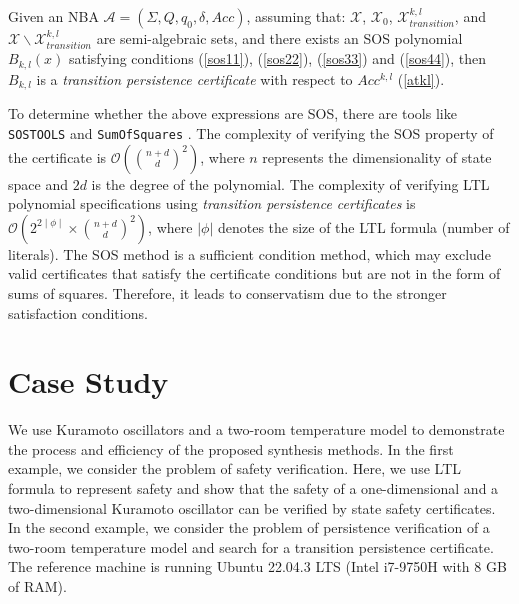 \documentclass[acmlarge]{acmart}
\begin{document}
\begin{lemma}
  Given an NBA $\mathcal{A} = (\Sigma, Q, q_0, \delta, Acc)$, assuming that: $ \mathcal{X}$, $ \mathcal{X}_{0}$, $\mathcal{X}_{transition}^{k,l}$, and $\mathcal{X} \backslash \mathcal{X}_{transition}^{k,l}$ are semi-algebraic sets, and there exists an SOS polynomial $B_{k, l}(x)$ satisfying conditions (\ref{sos11}), (\ref{sos22}), (\ref{sos33}) and (\ref{sos44}), then $B_{k, l}$ is a \textit{transition persistence certificate} with respect to $Acc^{k, l}$ (\ref{atkl}).
\end{lemma}

To determine whether the above expressions are SOS, there are tools like \texttt{SOSTOOLS} \cite{prajna2002introducing} and \texttt{SumOfSquares} \cite{Yuan_SumOfSquares_py}. The complexity of verifying the SOS property of the certificate is $\mathcal{O}\left( \binom{n+d}{d}^2 \right) $\cite{parrilo2003semidefinite}, where $ n $ represents the dimensionality of state space  and $ 2d $ is the degree of the polynomial. The complexity of verifying LTL polynomial specifications using \emph{transition persistence certificates} is $\mathcal{O}\left( 2^{2 \mid \phi \mid } \times \binom{n+d}{d}^2 \right)$, where $|\phi|$ denotes the size of the LTL formula (number of literals). The SOS method is a sufficient condition method, which may exclude valid certificates that satisfy the certificate conditions but are not in the form of sums of squares. Therefore, it leads to conservatism due to the stronger satisfaction conditions.


\section{Case Study}
We use Kuramoto oscillators \cite{guo2021overviews} and a two-room temperature model \cite{anand2024compositional} to demonstrate the process and efficiency of the proposed synthesis methods.
In the first example, we consider the problem of safety verification. Here, we use LTL formula to represent safety and show that the safety of a one-dimensional and a two-dimensional Kuramoto oscillator can be verified by state safety certificates. In the second example, we consider the problem of persistence verification of a two-room temperature model and search for a transition persistence certificate. The reference machine is running Ubuntu 22.04.3 LTS (Intel i7-9750H with 8 GB of RAM).
\end{document}
